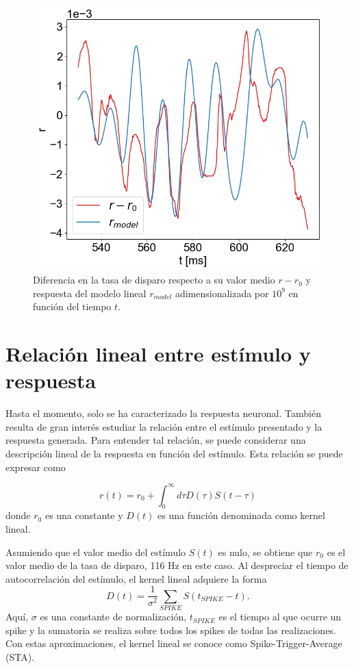 \documentclass[aps,prb,twocolumn,superscriptaddress,floatfix,longbibliography]{revtex4-2}
\begin{document}
\begin{figure}[H]
  \includegraphics[clip=true,width=0.8\columnwidth]{r_vs_r_model.png}
  \caption{Diferencia en la tasa de disparo respecto a su valor medio $r - r_0$ y respuesta del modelo lineal $r_{model}$ adimensionalizada por $10^9$ en función del tiempo $t$.}
   \label{fig:r_vs_r_model}
\end{figure}

\section{Relación lineal entre estímulo y respuesta}

Hasta el momento, solo se ha caracterizado la respuesta neuronal. También resulta de gran interés estudiar la relación entre el estímulo presentado y la respuesta generada. Para entender tal relación, se puede considerar una descripción lineal de la respuesta en función del estímulo. Esta relación se puede expresar como

\[r(t) = r_0 + \int_0^\infty d\tau D(\tau) S(t - \tau)\]
donde \( r_0 \) es una constante y \( D(t) \) es una función denominada como kernel lineal.

Asumiendo que el valor medio del estímulo $S(t)$ es nulo, se obtiene que $r_0$ es el valor medio de la tasa de disparo, 116 Hz en este caso. Al despreciar el tiempo de autocorrelación del estímulo, el kernel lineal adquiere la forma
\[D(t) = \frac{1}{\sigma^2} \sum_{SPIKE} S(t_{SPIKE} - t).\]
Aquí, \( \sigma \) es una constante de normalización, $t_{SPIKE}$ es el tiempo al que ocurre un spike y la sumatoria se realiza sobre todos los spikes de todas las realizaciones. Con estas aproximaciones, el kernel lineal se conoce como Spike-Trigger-Average (STA).
\end{document}
